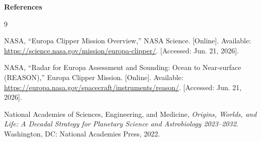 \documentclass[11pt]{article}
\begin{document}
\vspace{1em}

\noindent\textbf{References}

\begin{thebibliography}{9}

NASA, ``Europa Clipper Mission Overview,'' NASA Science. [Online]. Available: \url{https://science.nasa.gov/mission/europa-clipper/}. [Accessed: Jun. 21, 2026].

NASA, ``Radar for Europa Assessment and Sounding: Ocean to Near-surface (REASON),'' Europa Clipper Mission. [Online]. Available: \url{https://europa.nasa.gov/spacecraft/instruments/reason/}. [Accessed: Jun. 21, 2026].

National Academies of Sciences, Engineering, and Medicine, \textit{Origins, Worlds, and Life: A Decadal Strategy for Planetary Science and Astrobiology 2023--2032}. Washington, DC: National Academies Press, 2022.

\end{thebibliography}
\end{document}
